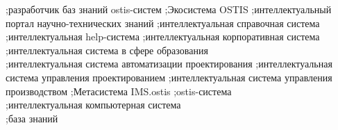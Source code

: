 {	
;разработчик баз знаний ostis-систем
;Экосистема OSTIS
;интеллектуальный портал научно-технических знаний
;интеллектуальная справочная система
;интеллектуальная help-система
;интеллектуальная корпоративная система
;интеллектуальная система в сфере образования\\
;интеллектуальная система автоматизации проектирования
;интеллектуальная система управления проектированием
;интеллектуальная система управления производством
;Метасистема IMS.ostis
;ostis-система\\
;интеллектуальная компьютерная система\\
;база знаний
}